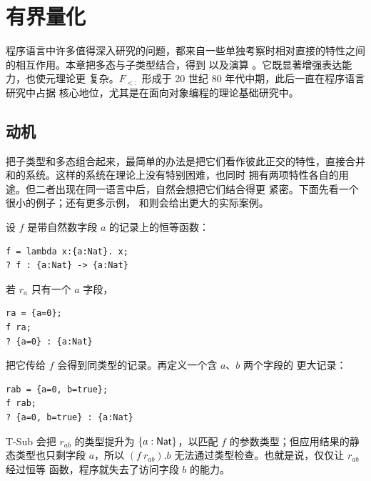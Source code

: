 
\chapter{有界量化}
\label{chap:26}

程序语言中许多值得深入研究的问题，都来自一些单独考察时相对直接的特性之间
的相互作用。本章把多态与子类型结合，得到
以及演算
。它既显著增强表达能力，也使元理论更
复杂。\(F_{<:}\) 形成于 20 世纪 80 年代中期，此后一直在程序语言研究中占据
核心地位，尤其是在面向对象编程的理论基础研究中。

\section{动机}
\label{sec:26.1}

把子类型和多态组合起来，最简单的办法是把它们看作彼此正交的特性，直接合并
和的系统。这样的系统在理论上没有特别困难，也同时
拥有两项特性各自的用途。但二者出现在同一语言中后，自然会想把它们结合得更
紧密。下面先看一个很小的例子；还有更多示例，
和则会给出更大的实际案例。

设 \(f\) 是带自然数字段 \(a\) 的记录上的恒等函数：
\begin{lstlisting}
f = lambda x:{a:Nat}. x;
? f : {a:Nat} -> {a:Nat}
\end{lstlisting}
若 \(r_a\) 只有一个 \(a\) 字段，
\begin{lstlisting}
ra = {a=0};
f ra;
? {a=0} : {a:Nat}
\end{lstlisting}
把它传给 \(f\) 会得到同类型的记录。再定义一个含 \(a\)、\(b\) 两个字段的
更大记录：
\begin{lstlisting}
rab = {a=0, b=true};
f rab;
? {a=0, b=true} : {a:Nat}
\end{lstlisting}
T-Sub 会把 \(r_{ab}\) 的类型提升为 \(\{a:\mathsf{Nat}\}\)，以匹配
\(f\) 的参数类型；但应用结果的静态类型也只剩字段 \(a\)，所以
\((f\ r_{ab}).b\) 无法通过类型检查。也就是说，仅仅让 \(r_{ab}\) 经过恒等
函数，程序就失去了访问字段 \(b\) 的能力。

